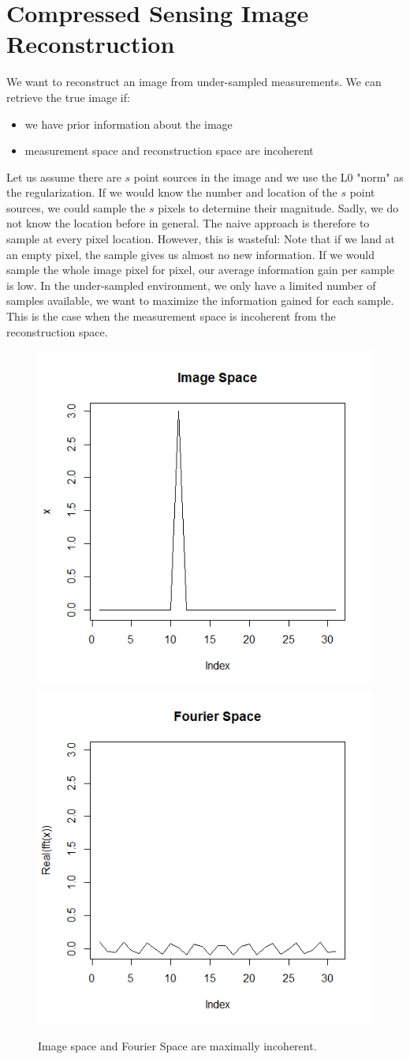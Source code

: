 \section{Compressed Sensing Image Reconstruction} \label{cs}
We want to reconstruct an image from under-sampled measurements. We can retrieve the true image if:

\begin{itemize}
	\item we have prior information about the image
	\item measurement space and reconstruction space are incoherent
\end{itemize}

Let us assume there are $s$ point sources in the image and we use the L0 "norm" as the regularization. If we would know the number and location of the $s$ point sources, we could sample the $s$ pixels to determine their magnitude. Sadly, we do not know the location before in general. The naive approach is therefore to sample at every pixel location. However, this is wasteful: Note that if we land at an empty pixel, the sample gives us almost no new information. If we would sample the whole image pixel for pixel, our average information gain per sample is low. In the under-sampled environment, we only have a limited number of samples available, we want to maximize the information gained for each sample. This is the case when the measurement space is incoherent from the reconstruction space.

\begin{figure}[h]
	\centering
	\includegraphics[width=0.4\linewidth]{./chapters/04.cs/img/incoherence.png}
	\includegraphics[width=0.4\linewidth]{./chapters/04.cs/img/incoherence_fft.png}
	\caption{Image space and Fourier Space are maximally incoherent.}
	\label{cs:incoherence}
\end{figure}

